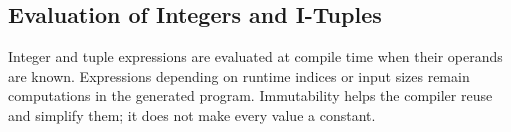 \subsection*{Evaluation of Integers and I-Tuples}

Integer and tuple expressions are evaluated at compile time when their operands are known. Expressions depending on runtime indices or input sizes remain computations in the generated program. Immutability helps the compiler reuse and simplify them; it does not make every value a constant.
